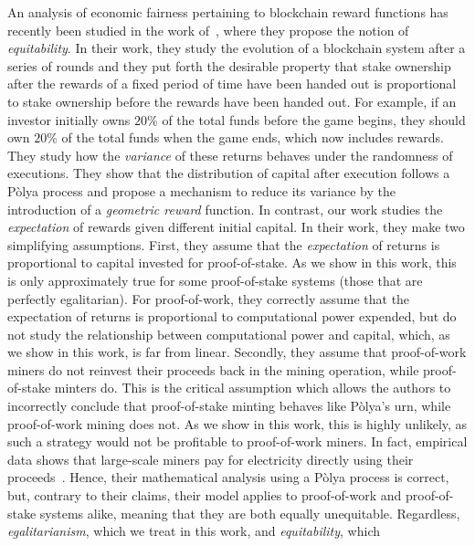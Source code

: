 
An analysis of economic fairness pertaining to blockchain reward functions has recently
been studied in the work of~\cite{equitability}, where they propose the notion
of \emph{equitability}. In their work, they study the evolution of a blockchain system
after a series of rounds and they put forth the desirable property that stake ownership
after the rewards of a fixed period of time have been handed out is proportional
to stake ownership before the rewards have been handed out. For example, if an
investor initially owns $20\%$ of the total funds before the game begins, they
should own $20\%$ of the total funds when the game ends, which now includes
rewards. They study how the \emph{variance} of these returns behaves under the
randomness of executions. They show that the distribution of capital after
execution follows a Pòlya process and propose a mechanism to reduce its
variance by the introduction of a \emph{geometric reward} function.
In contrast, our work studies the \emph{expectation} of rewards given different
initial capital.
In their work, they make two simplifying assumptions.
First, they assume that the \emph{expectation} of returns is proportional to
capital invested for proof-of-stake. As we show in this work, this is only
approximately true for some proof-of-stake systems (those that are perfectly egalitarian). For proof-of-work, they
correctly assume that the expectation of returns is proportional to computational
power expended, but do not study the relationship between computational power and
capital, which, as we show in this work, is far from linear. Secondly, they assume that
proof-of-work miners do not reinvest their proceeds back in the
mining operation, while proof-of-stake minters do. This is the critical assumption which allows the authors to incorrectly
conclude that proof-of-stake minting behaves like Pòlya's urn, while
proof-of-work mining does not. As we show in this work, this
is highly unlikely, as such a strategy would not be profitable to proof-of-work
miners. In fact, empirical data shows that large-scale miners pay for electricity
directly using their proceeds~\cite{is this even true?}. Hence, their mathematical analysis
using a Pòlya process is correct, but, contrary to their claims, their model applies to proof-of-work
and proof-of-stake systems alike, meaning that they are both equally unequitable. Regardless,
\emph{egalitarianism}, which we treat in this work, and \emph{equitability}, which
